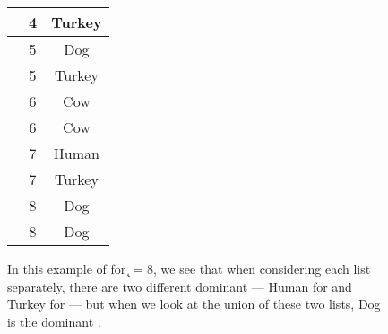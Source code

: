 \begin{figure}
{\begin{tabular}{c|c|c}
    \Sfive{}    & 4     & Turkey \\ \hline
    \Ssixt{}    & 5     & Dog \\ \hline
    \Sfive{}    & 5     & Turkey \\ \hline
    \Ssixt{}    & 6     & Cow \\ \hline
    \Sfive{}    & 6     & Cow \\ \hline
    \Ssixt{}    & 7     & Human \\ \hline
    \Sfive{}    & 7     & Turkey \\ \hline
    \Ssixt{}    & 8     & Dog \\ \hline
    \Sfive{}    & 8     & Dog \\ \hline
\end{tabular}
}
\quad
{}
\caption{In this example of \runion{} for \k{} = 8, we see that when considering each \itsshort{} \knnlong{} list separately, there are two different dominant \spec{} --- Human for \Ssixt{} and Turkey for \Sfive{} --- but when we look at the union of these two lists, Dog is the dominant \spec{}.
}
\label{fig:union:example}
\end{figure}